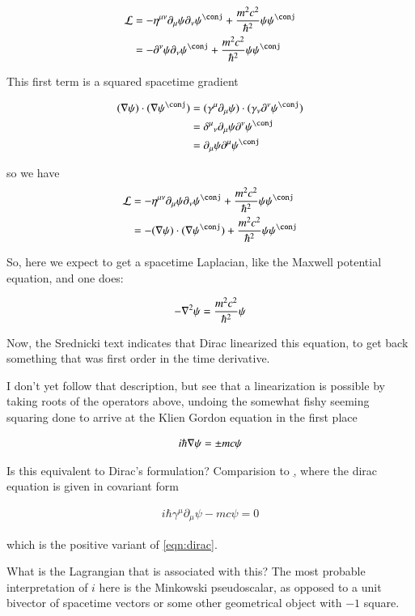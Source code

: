 \documentclass{article}
\begin{document}
\begin{align*}
\LL &= -\eta^{\mu\nu} \partial_\mu \psi \partial_\nu \psi^\conj + \frac{m^2 c^2}{\hbar^2} \psi \psi^\conj \\
&= -\partial^\nu \psi \partial_\nu \psi^\conj + \frac{m^2 c^2}{\hbar^2} \psi \psi^\conj \\
\end{align*}

This first term is a squared spacetime gradient

\begin{align*}
(\grad \psi) \cdot (\grad \psi^\conj) 
&= (\gamma^\mu \partial_\mu \psi) \cdot (\gamma_\nu \partial^\nu \psi^\conj) \\
&= {\delta^\mu}_\nu \partial_\mu \psi \partial^\nu \psi^\conj \\
&= \partial_\mu \psi \partial^\mu \psi^\conj \\
\end{align*}

so we have
\begin{align*}
\LL 
&= -\eta^{\mu\nu} \partial_\mu \psi \partial_\nu \psi^\conj + \frac{m^2 c^2}{\hbar^2} \psi \psi^\conj \\
&= -(\grad \psi) \cdot (\grad \psi^\conj) + \frac{m^2 c^2}{\hbar^2} \psi \psi^\conj \\
\end{align*}

So, here we expect to get a spacetime Laplacian, like the Maxwell potential equation, and one does:

\begin{align*}
-\nabla^2 \psi = \frac{m^2 c^2}{\hbar^2} \psi
\end{align*}

Now, the Srednicki text indicates that Dirac linearized this equation, to get back something that was
first order in the time derivative.

I don't yet follow that description, but see that a linearization is possible by taking roots of the operators above,
undoing the somewhat fishy seeming squaring done to arrive at the Klien Gordon equation in the first place

\begin{align}\label{eqn:dirac}
i \hbar \nabla \psi = \pm m c \psi
\end{align}

Is this equivalent to Dirac's formulation?  Comparision to 
\href{http://en.wikipedia.org/wiki/Dirac_equation#Covariant_form_and_relativistic_invariance}, where the dirac equation is given in covariant
form

\begin{align*}
i \hbar \gamma^\mu \partial_\mu \psi - m c \psi = 0
\end{align*}

which is the positive variant of \ref{eqn:dirac}.

What is the Lagrangian that is associated with this?  The most probable interpretation of $i$ here is the Minkowski pseudoscalar, as opposed to
a unit bivector of spacetime vectors or some other geometrical object with $-1$ square.



\end{document}
